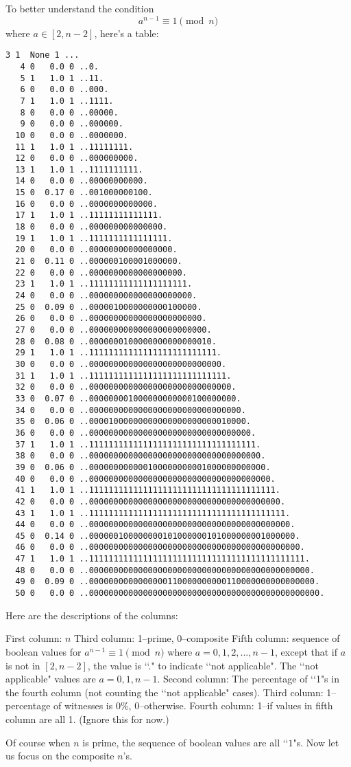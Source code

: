 To better understand the condition
\[
a^{n-1} \equiv 1 \pmod{n}
\]
where $a \in [2, n - 2]$, here's a table:
\begin{Verbatim}[frame=single,fontsize=\footnotesize]
   3 1  None 1 ...
   4 0   0.0 0 ..0.
   5 1   1.0 1 ..11.
   6 0   0.0 0 ..000.
   7 1   1.0 1 ..1111.
   8 0   0.0 0 ..00000.
   9 0   0.0 0 ..000000.
  10 0   0.0 0 ..0000000.
  11 1   1.0 1 ..11111111.
  12 0   0.0 0 ..000000000.
  13 1   1.0 1 ..1111111111.
  14 0   0.0 0 ..00000000000.
  15 0  0.17 0 ..001000000100.
  16 0   0.0 0 ..0000000000000.
  17 1   1.0 1 ..11111111111111.
  18 0   0.0 0 ..000000000000000.
  19 1   1.0 1 ..1111111111111111.
  20 0   0.0 0 ..00000000000000000.
  21 0  0.11 0 ..000000100001000000.
  22 0   0.0 0 ..0000000000000000000.
  23 1   1.0 1 ..11111111111111111111.
  24 0   0.0 0 ..000000000000000000000.
  25 0  0.09 0 ..0000010000000000100000.
  26 0   0.0 0 ..00000000000000000000000.
  27 0   0.0 0 ..000000000000000000000000.
  28 0  0.08 0 ..0000000100000000000000010.
  29 1   1.0 1 ..11111111111111111111111111.
  30 0   0.0 0 ..000000000000000000000000000.
  31 1   1.0 1 ..1111111111111111111111111111.
  32 0   0.0 0 ..00000000000000000000000000000.
  33 0  0.07 0 ..000000001000000000000100000000.
  34 0   0.0 0 ..0000000000000000000000000000000.
  35 0  0.06 0 ..00001000000000000000000000010000.
  36 0   0.0 0 ..000000000000000000000000000000000.
  37 1   1.0 1 ..1111111111111111111111111111111111.
  38 0   0.0 0 ..00000000000000000000000000000000000.
  39 0  0.06 0 ..000000000000100000000001000000000000.
  40 0   0.0 0 ..0000000000000000000000000000000000000.
  41 1   1.0 1 ..11111111111111111111111111111111111111.
  42 0   0.0 0 ..000000000000000000000000000000000000000.
  43 1   1.0 1 ..1111111111111111111111111111111111111111.
  44 0   0.0 0 ..00000000000000000000000000000000000000000.
  45 0  0.14 0 ..000000100000000101000000101000000001000000.
  46 0   0.0 0 ..0000000000000000000000000000000000000000000.
  47 1   1.0 1 ..11111111111111111111111111111111111111111111.
  48 0   0.0 0 ..000000000000000000000000000000000000000000000.
  49 0  0.09 0 ..0000000000000000110000000000110000000000000000.
  50 0   0.0 0 ..00000000000000000000000000000000000000000000000.
\end{Verbatim}
Here are the descriptions of the columns:
\begin{enumerate}[nosep]
  \li First column: $n$
  \li Third column: 1--prime, 0--composite
  \li Fifth column: sequence of boolean values for
  $a^{n-1} \equiv 1 \pmod{n}$
  where $a = 0, 1, 2, ..., n - 1$, except that if
  $a$ is not in $[2, n-2]$,
  the value is \lq\lq ." to indicate \lq\lq not applicable".
  The \lq\lq not applicable" values are $a = 0, 1, n-1$.
  \li Second column: The percentage of \lq\lq 1"s in the fourth column
  (not counting the \lq\lq not applicable" cases).
  \li Third column: 1--percentage of witnesses is 0\%, 0--otherwise.
  \li Fourth column: 1--if values in fifth column are all 1.
  (Ignore this for now.)
\end{enumerate}
Of course when $n$ is prime, the sequence of boolean values are all
\lq\lq $1$"s.
Now let us focus on the composite $n$'s.

